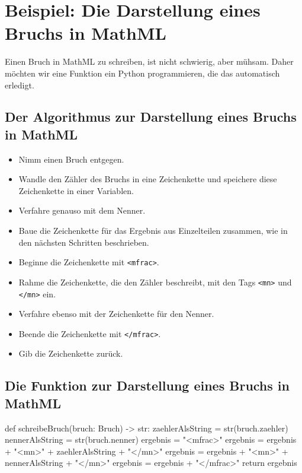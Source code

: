 \section{Beispiel: Die Darstellung eines Bruchs in MathML}

Einen Bruch in MathML zu schreiben, ist nicht schwierig, aber mühsam. Daher möchten wir eine Funktion ein Python programmieren, die das automatisch erledigt.

\subsection*{Der Algorithmus zur Darstellung eines Bruchs in MathML}

\begin{itemize}
	\item Nimm einen Bruch entgegen.
	\item Wandle den Zähler des Bruchs in eine Zeichenkette und speichere diese Zeichenkette in einer Variablen.
	\item Verfahre genauso mit dem Nenner.
	\item Baue die Zeichenkette für das Ergebnis aus Einzelteilen zusammen, wie in den nächsten Schritten beschrieben.
	\item Beginne die Zeichenkette mit \texttt{<mfrac>}.
	\item Rahme die Zeichenkette, die den Zähler beschreibt, mit den Tags \texttt{<mn>} und \texttt{</mn>} ein.
	\item Verfahre ebenso mit der Zeichenkette für den Nenner.
	\item Beende die Zeichenkette mit \texttt{</mfrac>}.
	\item Gib die Zeichenkette zurück.
\end{itemize}

\subsection*{Die Funktion zur Darstellung eines Bruchs in MathML}
\label{sec:MathMLBruch}

\begin{codePython}
def schreibeBruch(bruch: Bruch) -> str:	
	zaehlerAlsString = str(bruch.zaehler)
	nennerAlsString = str(bruch.nenner)
	ergebnis = "<mfrac>"
	ergebnis = ergebnis + "<mn>" + zaehlerAlsString + "</mn>"
	ergebnis = ergebnis + "<mn>" + nennerAlsString + "</mn>"
	ergebnis = ergebnis + "</mfrac>"
	return ergebnis
\end{codePython}